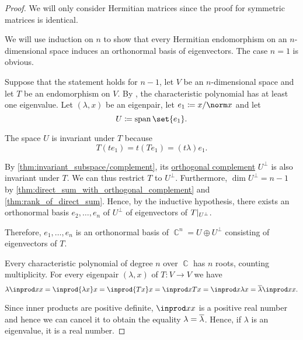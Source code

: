 \begin{proof}
  We will only consider Hermitian matrices since the proof for symmetric matrices is identical.

   We will use induction on \( n \) to show that every Hermitian endomorphism on an \( n \)-dimensional space induces an orthonormal basis of eigenvectors. The case \( n = 1 \) is obvious.

  Suppose that the statement holds for \( n - 1 \), let \( V \) be an \( n \)-dimensional space and let \( T \) be an endomorphism on \( V \). By , the characteristic polynomial has at least one eigenvalue. Let \( (\lambda, x) \) be an eigenpair, let \( e_1 \coloneqq x / \norm x \) and let
  \begin{equation*}
    U \coloneqq \linspan\set{ e_1 }.
  \end{equation*}

  The space \( U \) is invariant under \( T \) because
  \begin{equation*}
    T(t e_1) = t(T e_1) = (t\lambda) e_1.
  \end{equation*}

  By \cref{thm:invariant_subspace/complement}, its \hyperref[def:orthogonality]{orthogonal complement} \( U^\perp \) is also invariant under \( T \). We can thus restrict \( T \) to \( U^\perp \). Furthermore, \( \dim U^\perp = n - 1 \) by \cref{thm:direct_sum_with_orthogonal_complement} and \cref{thm:rank_of_direct_sum}. Hence, by the inductive hypothesis, there exists an orthonormal basis \( e_2, \ldots, e_n \) of \( U^\perp \) of eigenvectors of \( T\vert_{U^\perp} \).

  Therefore, \( e_1, \ldots, e_n \) is an orthonormal basis of \( \BbbC^n = U \oplus U^\perp \) consisting of eigenvectors of \( T \).

   Every characteristic polynomial of degree \( n \) over \( \BbbC \) has \( n \) roots, counting multiplicity. For every eigenpair \( (\lambda, x) \) of \( T: V \to V \) we have
  \begin{equation*}
    \lambda \inprod x x
    =
    \inprod {\lambda x} x
    =
    \inprod {T x} x
    =
    \inprod x {T x}
    =
    \inprod x {\lambda x}
    =
    \oline \lambda \inprod x x.
  \end{equation*}

  Since inner products are positive definite, \( \inprod x x \) is a positive real number and hence we can cancel it to obtain the equality \( \lambda = \oline \lambda \). Hence, if \( \lambda \) is an eigenvalue, it is a real number.


\end{proof}
